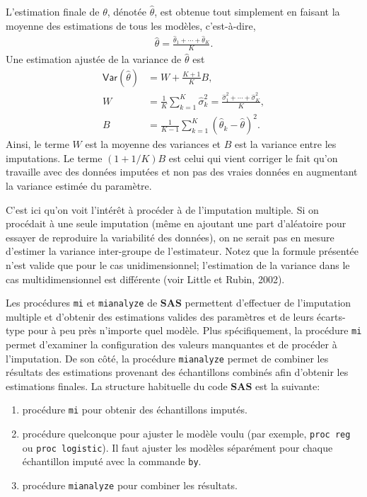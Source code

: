 \documentclass[
  11pt,
  letterpaper,
]{book}
\providecommand{\tightlist}{%
  \setlength{\itemsep}{0pt}\setlength{\parskip}{0pt}}
\theoremstyle{definition}
\theoremstyle{definition}
\theoremstyle{definition}
\theoremstyle{remark}
\begin{document}
L'estimation finale de \(\theta\), dénotée \(\widehat{\theta}\), est obtenue tout simplement en faisant la moyenne des estimations de tous les modèles, c'est-à-dire,
\begin{align*}
\widehat{\theta} = \frac{\widehat{\theta}_1 + \cdots + \widehat{\theta}_K}{K}.
\end{align*}
Une estimation ajustée de la variance de \(\widehat{\theta}\) est
\begin{align*}
{\mathsf{Var}}\left(\hat{\theta}\right) &= W+ \frac{K+1}{K}B, 
\\ W &= \frac{1}{K} \sum_{k=1}^K \widehat{\sigma}^2_k = \frac{\widehat{\sigma}_1^2 + \cdots + \widehat{\sigma}_K^2}{K},\\
B &= \frac{1}{K-1} \sum_{k=1}^K (\widehat{\theta}_k - \widehat{\theta})^2.
\end{align*}
Ainsi, le terme \(W\) est la moyenne des variances et \(B\) est la variance entre les imputations. Le terme \((1+1/K)B\) est celui qui vient corriger le fait qu'on travaille avec des données imputées et non pas des vraies données en augmentant la variance estimée du paramètre.

C'est ici qu'on voit l'intérêt à procéder à de l'imputation multiple. Si on procédait à une seule imputation (même en ajoutant une part d'aléatoire pour essayer de reproduire la variabilité des données), on ne serait pas en mesure d'estimer la variance inter-groupe de l'estimateur. Notez que la formule présentée n'est valide que pour le cas unidimensionnel; l'estimation de la variance dans le cas multidimensionnel est différente (voir Little et Rubin, 2002).

Les procédures \texttt{mi} et \texttt{mianalyze} de \textbf{SAS} permettent d'effectuer de l'imputation multiple et d'obtenir des estimations valides des paramètres et de leurs écarts-type pour à peu près n'importe quel modèle. Plus spécifiquement, la procédure \texttt{mi} permet d'examiner la configuration des valeurs manquantes et de procéder à l'imputation. De son côté, la procédure \texttt{mianalyze} permet de combiner les résultats des estimations provenant des échantillons combinés afin d'obtenir les estimations finales. La structure habituelle du code \textbf{SAS} est la suivante:

\begin{enumerate}
\def\labelenumi{\arabic{enumi}.}
\tightlist
\item
  procédure \texttt{mi} pour obtenir des échantillons imputés.
\item
  procédure quelconque pour ajuster le modèle voulu (par exemple, \texttt{proc\ reg} ou \texttt{proc\ logistic}). Il faut ajuster les modèles séparément pour chaque échantillon imputé avec la commande \texttt{by}.
\item
  procédure \texttt{mianalyze} pour combiner les résultats.
\end{enumerate}
\end{document}
